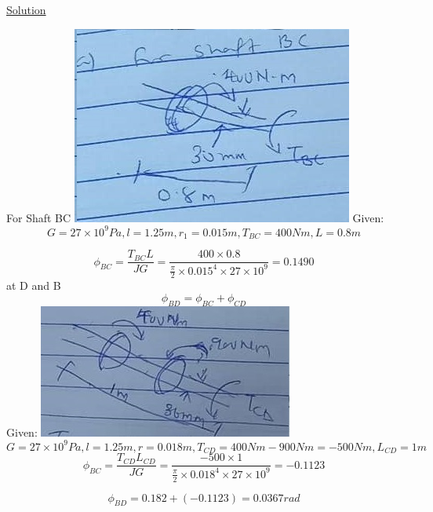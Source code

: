 \documentclass{article}
\begin{document}
\begin{center}\underline{Solution}\end{center}
For Shaft BC\newline
\includegraphics{IMG-20220210-WA0014}\newline
Given:  \[ G = 27\times10^{9}Pa, l = 1.25m, r_{1} = 0.015m, T_{BC} = 400Nm, L = 0.8m\]
 
\[\phi_{BC} = \frac{T_{BC}L}{JG} = \frac{400\times0.8}{\frac{\pi}{2}\times0.015^{4}\times27\times10^{9}} = 0.1490\]
\newline at D and B
\[\phi_{BD} = \phi_{BC} + \phi_{CD}\]
Given: \newline
\includegraphics{IMG-20220210-WA0016}\newline
 \[ G = 27\times10^{9}Pa, l = 1.25m, r = 0.018m, T_{CD} = 400Nm - 900Nm = -500Nm , L_{CD} = 1m\]
\[\phi_{BC} = \frac{T_{CD}L_{CD}}{JG} = \frac{-500\times1}{\frac{\pi}{2}\times0.018^{4}\times27\times10^{9}} = -0.1123\]

\[\phi_{BD} = 0.182 + (-0.1123) = 0.0367rad\]


\end{document}
